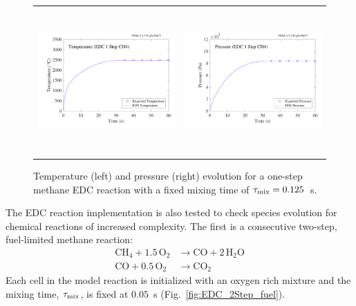 \documentclass[11pt]{book}
\begin{document}
\begin{figure}[!ht]
\begin{tabular*}{\textwidth}{lr}
\includegraphics[height=2.2in]{SCRIPT_FIGURES/reactionrate_EDC_1step_nonmix_temp} &
\includegraphics[height=2.2in]{SCRIPT_FIGURES/reactionrate_EDC_1step_nonmix_pres}
\end{tabular*}
\caption[Temperature and pressure evolution in a 1-step Methane EDC reaction]{Temperature (left) and pressure (right) evolution for a one-step methane EDC reaction with a fixed mixing time of $\tau_{\rm mix}=0.125$~s.}
\label{fig:EDC_meth_non_temppres}
\end{figure}

The EDC reaction implementation is also tested to check species evolution for chemical reactions of increased complexity. The first is a consecutive two-step, fuel-limited methane reaction:
\begin{align}\label{eq:2step_methane}
\mathrm{CH_4 + 1.5 \, O_2} &\rightarrow  \mathrm{CO + 2 \, H_2O} \\
\nonumber \mathrm{CO + 0.5 \, O_2} &\rightarrow \mathrm{CO_2}
\end{align}
Each cell in the model reaction is initialized with an oxygen rich mixture and the mixing time, $\tau_{\rm mix}$, is fixed at $0.05$~s (Fig.~\ref{fig:EDC_2Step_fuel}).
\end{document}
